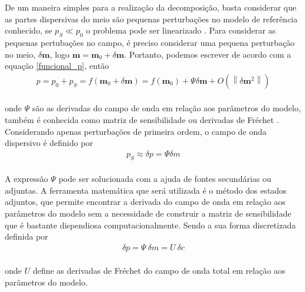 De um maneira simples para a realização da decomposição, basta considerar que as partes dispersivas do meio são pequenas perturbações no modelo de referência conhecido, se $p_{S} \ll p_{0}$ o problema pode ser linearizado \citep{symes_2008}. Para considerar as pequenas pertubações no campo, é preciso considerar uma pequena perturbação no meio, $\delta \mathbf{m}$, logo $\mathbf{m} =  \mathbf{m}_{0} + \delta \mathbf{m}$. Portanto, podemos escrever de acordo com a equação \ref{funcional_p}, então \\
\begin{eqnarray}
 p = p_{0} + p_{S} = f (\mathbf{m}_{0} +\delta \mathbf{m}) = f(\mathbf{m}_{0}) + \Psi \delta\mathbf{m} + O\left(\left\|\delta \mathbf{m}^{2} \right\|\right)
\end{eqnarray}
\\
onde $\Psi$ são as derivadas do campo de onda em relação aos parâmetros do modelo, também é conhecida como matriz de sensibilidade ou derivadas de Fréchet \citep{troltzsch_2010}. Considerando apenas perturbações de primeira ordem, o campo de onda dispersivo é definido por \\
\begin{eqnarray}
  p_{S} \approx \delta p = \Psi \delta m
\end{eqnarray}
\\
    A expressão $\Psi$ pode ser solucionada com a ajuda de fontes secundárias ou adjuntas. A ferramenta matemática que será utilizada é o método dos estados adjuntos, que permite encontrar a derivada do campo de onda em relação aos parâmetros do modelo sem a necessidade de construir a matriz de sensibilidade que é bastante dispendiosa computacionalmente. Sendo a sua forma discretizada definida por\\
    \begin{eqnarray}
     \delta p = \Psi~\delta m = U~\delta c
    \end{eqnarray}
\\
    onde $U$ define as derivadas de Fréchet do campo de onda total em relação aos parâmetros do modelo. 
    
